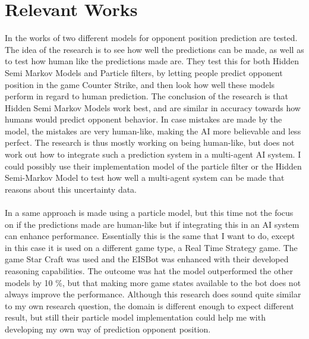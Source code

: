 \documentclass{article}
\begin{document}
\section{Relevant Works}
In the works of \citep{Hladky_anevaluation} two different models for opponent position prediction are tested. The idea of the research is to see how well the predictions can be made, as well as to test how human like the predictions made are. They test this for both Hidden Semi Markov Models and Particle filters, by letting people predict opponent position in the game Counter Strike, and then look how well these models perform in regard to human prediction. The conclusion of the research is that Hidden Semi Markov Models work best, and are similar in accuracy towards how humans would predict opponent behavior. In case mistakes are made by the model, the mistakes are very human-like, making the AI more believable and less perfect. The research is thus mostly working on being human-like, but does not work out how to integrate such a prediction system in a multi-agent AI system. I could possibly use their implementation model of the particle filter or the Hidden Semi-Markov Model to test how well a multi-agent system can be made that reasons about this uncertainty data.
\\\\
In \citep{weber2011aiide} a same approach is made using a particle model, but this time not the focus on if the predictions made are human-like but if integrating this in an AI system can enhance performance. Essentially this is the same that I want to do, except in this case it is used on a different game type, a Real Time Strategy game. The game Star Craft was used and the EISBot was enhanced with their developed reasoning capabilities. The outcome was hat the model outperformed the other models by 10 \%, but that making more game states available to the bot does not always improve the performance. Although this research does sound quite similar to my own research question, the domain is different enough to expect different result, but still their particle model implementation could help me with developing my own way of prediction opponent position.
\\\\
\end{document}
